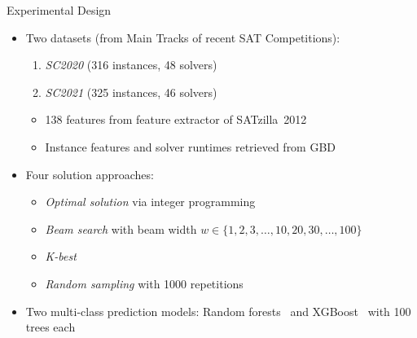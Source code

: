 \documentclass[en]{sdqbeamer}
\begin{document}
\begin{frame}[t]{Experimental Design}
	\begin{itemize}
		\item Two datasets (from Main Tracks of recent SAT Competitions):
		\begin{enumerate}[1)]
			\item \emph{SC2020} (316 instances, 48 solvers)~\cite{balyo2020proceedings}
			\item \emph{SC2021} (325 instances, 46 solvers)~\cite{balyo2021proceedings}
		\end{enumerate}
		\begin{itemize}
			\item 138 features from feature extractor of SATzilla~2012~\cite{xu2012features, xu2012satzilla2012}
			\item Instance features and solver runtimes retrieved from GBD~\cite{iser2020collaborative}
		\end{itemize}
		\pause
		\vspace{\baselineskip}
		\item Four solution approaches:
		\begin{itemize}
			\item \emph{Optimal solution} via integer programming~\cite{python-mip}
			\item \emph{Beam search} with beam width $w \in \{1, 2, 3, \dots, 10, 20, 30, \dots, 100\}$
			\item \emph{K-best}
			\item \emph{Random sampling} with 1000 repetitions
		\end{itemize}
		\pause
		\vspace{\baselineskip}
		\item Two multi-class prediction models: Random forests~\cite{breiman2001random, scikit-learn} and XGBoost~\cite{xgboost} with 100 trees each
	\end{itemize}
\end{frame}
\end{document}
